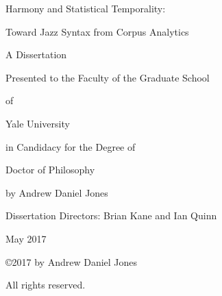 \documentclass[12pt,titlepage]{report}
\begin{document}
\setcounter{page}{1}
\newpage

\titlepage
\addtocounter{page}{3}

\vspace{1in}

\centerline{ \large Harmony and Statistical Temporality:}

\centerline{ \large Toward Jazz Syntax from Corpus Analytics}

\vspace{3.5in}

{\centering
{}
A Dissertation

Presented to the Faculty of the Graduate School

of

Yale University

in Candidacy for the Degree of

Doctor of Philosophy

\vspace{1.5in}

by
Andrew Daniel Jones

\vspace{0.5in}

Dissertation Directors: Brian Kane and Ian Quinn

\vspace{0.5in}

May 2017

}

\newpage

\vspace{2.5in}

\centerline{\copyright 2017 by Andrew Daniel Jones}

\centerline{All rights reserved.}


\newpage

\tableofcontents
\newpage
{
\listoffigures
\newpage
\listoftables
\newpage
}


\setcounter{page}{1}


%
%
\printbibliography
\end{document}
